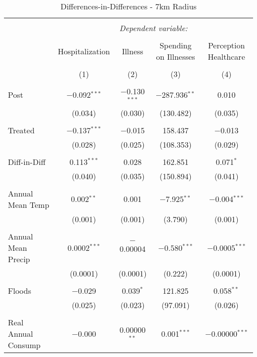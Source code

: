 
\begin{table}[!htbp] \centering 
  \caption{Differences-in-Differences - 7km Radius} 
  \label{} 
\begin{tabular}{@{\extracolsep{5pt}}lcccc} 
\\[-1.8ex]\hline 
\hline \\[-1.8ex] 
 & \multicolumn{4}{c}{\textit{Dependent variable:}} \\ 
\cline{2-5} 
\\[-1.8ex] & Hospitalization & Illness & Spending on Illnesses & Perception Healthcare \\ 
\\[-1.8ex] & (1) & (2) & (3) & (4)\\ 
\hline \\[-1.8ex] 
 Post & $-$0.092$^{***}$ & $-$0.130$^{***}$ & $-$287.936$^{**}$ & 0.010 \\ 
  & (0.034) & (0.030) & (130.482) & (0.035) \\ 
  & & & & \\ 
 Treated & $-$0.137$^{***}$ & $-$0.015 & 158.437 & $-$0.013 \\ 
  & (0.028) & (0.025) & (108.353) & (0.029) \\ 
  & & & & \\ 
 Diff-in-Diff & 0.113$^{***}$ & 0.028 & 162.851 & 0.071$^{*}$ \\ 
  & (0.040) & (0.035) & (150.894) & (0.041) \\ 
  & & & & \\ 
 Annual Mean Temp & 0.002$^{**}$ & 0.001 & $-$7.925$^{**}$ & $-$0.004$^{***}$ \\ 
  & (0.001) & (0.001) & (3.790) & (0.001) \\ 
  & & & & \\ 
 Annual Mean Precip & 0.0002$^{***}$ & $-$0.00004 & $-$0.580$^{***}$ & $-$0.0005$^{***}$ \\ 
  & (0.0001) & (0.0001) & (0.222) & (0.0001) \\ 
  & & & & \\ 
 Floods & $-$0.029 & 0.039$^{*}$ & 121.825 & 0.058$^{**}$ \\ 
  & (0.025) & (0.023) & (97.091) & (0.026) \\ 
  & & & & \\ 
 Real Annual Consump & $-$0.000 & 0.00000$^{**}$ & 0.001$^{***}$ & $-$0.00000$^{***}$ \\ 

\end{tabular}
\end{table}

